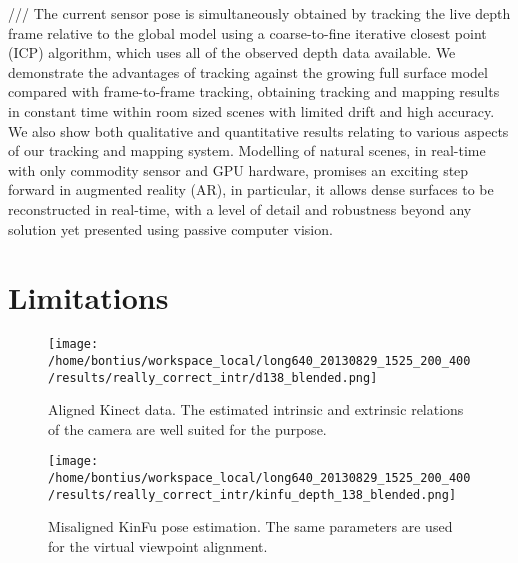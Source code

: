 \documentclass{ucl_thesis}
\begin{document}
/// The current sensor pose is simultaneously obtained by
tracking the live depth frame relative to the global model using a
coarse-to-fine iterative closest point (ICP) algorithm, which uses
all of the observed depth data available. We demonstrate the advantages
of tracking against the growing full surface model compared
with frame-to-frame tracking, obtaining tracking and mapping results
in constant time within room sized scenes with limited drift
and high accuracy. We also show both qualitative and quantitative
results relating to various aspects of our tracking and mapping system.
Modelling of natural scenes, in real-time with only commodity
sensor and GPU hardware, promises an exciting step forward
in augmented reality (AR), in particular, it allows dense surfaces to
be reconstructed in real-time, with a level of detail and robustness
beyond any solution yet presented using passive computer vision.

\section{Limitations} 
\label{sec:limitations}

\begin{figure}[h!]\centering
	\begin{minipage}[b]{0.49\linewidth}
		\texttt{[image: /home/bontius/workspace\_local/long640\_20130829\_1525\_200\_400/results/really\_correct\_intr/d138\_blended.png]}
		\caption{Aligned Kinect data. The estimated intrinsic and extrinsic relations of the camera are well suited for the purpose.}
		\label{fig:limit_kinfu_pose}
	\end{minipage}
	\begin{minipage}[b]{0.49\linewidth}
		\texttt{[image: /home/bontius/workspace\_local/long640\_20130829\_1525\_200\_400/results/really\_correct\_intr/kinfu\_depth\_138\_blended.png]}
		\caption{Misaligned KinFu pose estimation. The same parameters are used for the virtual viewpoint alignment.}
		\label{fig:limit_kinfu_pose_2}
	\end{minipage}
\end{figure}
\end{document}
